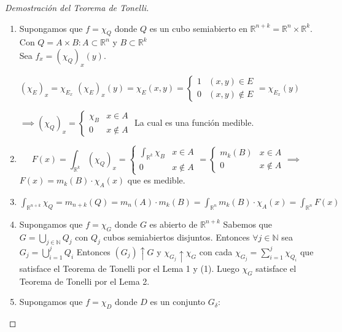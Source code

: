 \begin{proof}[Demostración del Teorema de Tonelli]
    \begin{enumerate}
        \item Supongamos que $f = \chi_{Q}$ donde $Q$ es un cubo semiabierto en $\mathbb{R}^{n+k} = \mathbb{R}^n \times \mathbb{R}^k$. Con $Q = A \times B : A \subset \mathbb{R}^n$ y $B \subset \mathbb{R}^k$ \\ Sea  $f_x = (\chi_Q)_x(y)$.
        \begin{observación}
            $(\chi_E)_x = \chi_{E_x}$
            $(\chi_E)_x(y) = \chi_E(x, y) = \begin{cases} 1 & (x, y) \in E \\ 0 & (x, y) \notin E \end{cases} = \chi_{E_x}(y)$
        \end{observación}
        $\implies (\chi_Q)_x = \begin{cases}
            \chi_B & x \in A \\
            0 & x \notin A
        \end{cases}$ La cual es una función medible. 
        \item $$F(x) = \int_{\mathbb{R}^k} (\chi_Q)_x = \begin{cases}
            \int_{\mathbb{R}^k}\chi_B & x \in A \\
            0 & x \notin A
        \end{cases} = \begin{cases}
            m_k(B) & x \in A \\
            0 & x \notin A
        \end{cases} \implies$$
        $F(x) = m_k(B) \cdot \chi_A(x)$ que es medible.
        \item $\int_{\mathbb{R}^{n+k}}\chi_Q = m_{n+k}(Q) = m_n(A) \cdot m_k(B) = \int_{\mathbb{R}^n}m_k(B) \cdot \chi_A(x) = \int_{\mathbb{R}^n}F(x)$
        \item Supongamos que $f = \chi_G$ donde $G$ es abierto de $\mathbb{R}^{n+k}$ Sabemos que $G = \bigcup_{j \in \mathbb{N}}Q_j$ con $Q_j$ cubos semiabiertos disjuntos. Entonces $\forall j \in \mathbb{N}$ sea $G_j = \bigcup_{i = 1}^{j}Q_i$ Entonces $(G_j)\uparrow G$ y $\chi_{G_j} \uparrow \chi_G$ con cada $\chi_{G_j} = \sum_{i = 1}^{j}\chi_{Q_i}$ que satisface el Teorema de Tonelli por el Lema 1 y (1). Luego $\chi_G$ satisface el Teorema de Tonelli por el Lema 2.
        \item Supongamos que $f = \chi_D$ donde $D$ es un conjunto $G_{\delta}$: 

\end{enumerate}
\end{proof}
